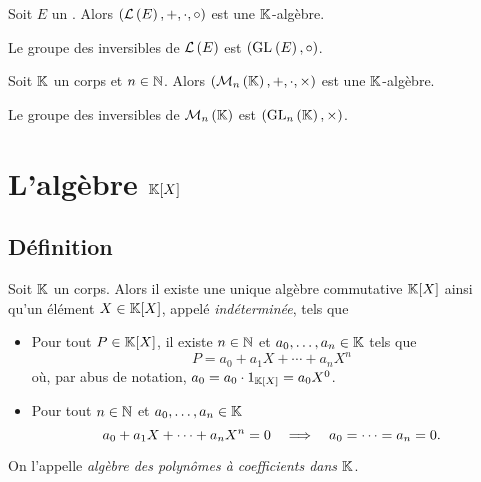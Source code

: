 \documentclass{magnolia}
\begin{document}
\begin{proposition}
Soit $E$ un \Kev. Alors $(\mathcal{L}\left(E\right),+,\cdot,\circ)$ est une $\mathbb{K}$-algèbre.
\end{proposition}

\begin{remarqueUnique}
\remarque Le groupe des inversibles de $\mathcal{L}\left(E\right)$ est $({\rm GL}_{}\left(E\right),\circ)$.
\end{remarqueUnique}

\begin{proposition}
Soit $\mathbb{K}$ un corps et $n\in\mathbb{N}$. Alors $(\mathcal{M}_{n}\left(\mathbb{K}\right),+,\cdot,\times)$ est une $\mathbb{K}$-algèbre.
\end{proposition}

\begin{remarqueUnique}
\remarque Le groupe des inversibles de $\mathcal{M}_{n}\left(\mathbb{K}\right)$ est $({\rm GL}_{n}\left(\mathbb{K}\right),\times)$.
\end{remarqueUnique}

\section{L'algèbre $\polyK$}

\subsection{Définition}
\begin{definition}
Soit $\mathbb{K}$ un corps. Alors il existe une unique algèbre commutative $\polyK$ ainsi
qu'un élément $X\in\polyK$, appelé \emph{indéterminée}, tels que
\begin{itemize}
\item Pour tout $P\in\polyK$, il existe $n\in\mathbb{N}$ et $a_0,\ldots,a_n\in\mathbb{K}$ tels
  que
  \[P=a_0+a_1 X+\cdots+a_n X^n\]
  où, par abus de notation, $a_0=a_0\cdot 1_{\polyK}=a_0 X^0$.
\item Pour tout $n\in\mathbb{N}$ et $a_0,\ldots,a_n\in\mathbb{K}$
  \[a_0+a_1X+\cdots+a_n X^n=0 \quad\Longrightarrow\quad  a_0=\cdots=a_n=0.\]
\end{itemize}
On l'appelle \emph{algèbre des polynômes à coefficients dans $\mathbb{K}$}.
\end{definition}
\end{document}
